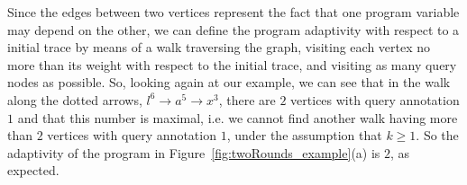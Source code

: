 \begin{example}[twoRounds]
      
      Since the edges between two vertices represent the fact that one program variable may depend on the other,
      we can define the program adaptivity with respect to a initial trace by means of a walk traversing the graph, visiting each vertex no more than its weight with respect to the initial trace, and visiting as many query nodes as possible.
      So, looking again at our example, we can see that
      in the walk along the dotted arrows,  $l^{6} \to a^5 \to x^3 $, there are $2$ vertices with query annotation $1$ and that this number is maximal, i.e. we cannot find another walk having more than $2$ vertices with query annotation $1$, under the assumption that $k \geq 1$. So the adaptivity of the program in Figure~\ref{fig:twoRounds_example}(a)  is $2$,
      as expected.
{\small
\begin{figure}
\centering
\begin{subfigure}{.2\textwidth}
\end{subfigure}
\end{figure}}
\end{example}
